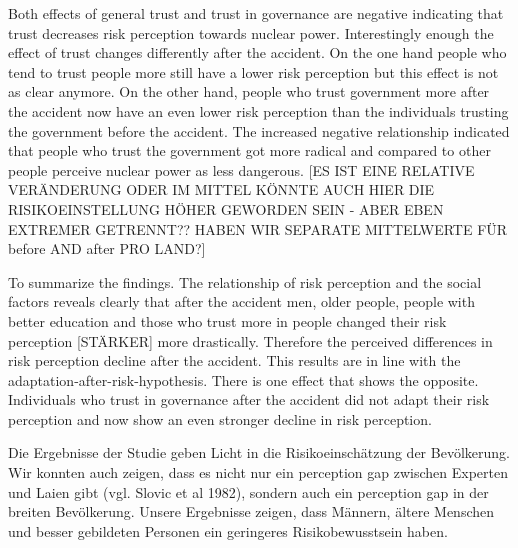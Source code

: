 Both effects of general trust and trust in governance are negative indicating that trust decreases risk perception towards nuclear power. Interestingly enough the effect of trust changes differently after the accident. On the one hand people who tend to trust people more still have a lower risk perception but this effect is not as clear anymore. On the other hand, people who trust government more after the accident now have an even lower risk perception than the individuals trusting the government before the accident. The increased negative relationship indicated that people who trust the government got more radical and compared to other people perceive nuclear power as less dangerous. [ES IST EINE RELATIVE VERÄNDERUNG ODER IM MITTEL KÖNNTE AUCH HIER DIE RISIKOEINSTELLUNG HÖHER GEWORDEN SEIN - ABER EBEN EXTREMER GETRENNT?? HABEN WIR SEPARATE MITTELWERTE FÜR before AND after PRO LAND?]






To summarize the findings. The relationship of risk perception and the social factors reveals clearly that after the accident men, older people,  people with better education and those who trust more in people changed their risk perception [STÄRKER] more drastically. Therefore the perceived differences in risk perception decline after the accident. This results are in line with the adaptation-after-risk-hypothesis. There is one effect that shows the opposite. Individuals who trust in governance after the accident did not adapt their risk perception and now show an even stronger decline in risk perception. 








Die Ergebnisse der Studie geben Licht in die Risikoeinschätzung der Bevölkerung.    
Wir konnten auch zeigen, dass es nicht nur ein perception gap zwischen Experten und Laien gibt (vgl. Slovic et al 1982), sondern auch ein perception gap in der breiten Bevölkerung. Unsere Ergebnisse zeigen, dass  Männern, ältere Menschen und besser gebildeten Personen ein geringeres Risikobewusstsein haben. 

